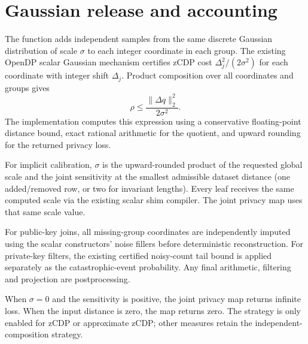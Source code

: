 \documentclass{article}
\begin{document}
\section{Gaussian release and accounting}

The function adds independent samples from the same discrete Gaussian
distribution of scale \(\sigma\) to each integer coordinate in each group.
The existing OpenDP scalar Gaussian mechanism certifies zCDP cost
\(\Delta_j^2/(2\sigma^2)\) for each coordinate with integer shift
\(\Delta_j\). Product composition over all coordinates and groups gives
\[
  \rho \le \frac{\|\Delta q\|_2^2}{2\sigma^2}.
\]
The implementation computes this expression using a conservative
floating-point distance bound, exact rational arithmetic for the quotient,
and upward rounding for the returned privacy loss.

For implicit calibration, \(\sigma\) is the upward-rounded product of the
requested global scale and the joint sensitivity at the smallest admissible
dataset distance (one added/removed row, or two for invariant lengths).
Every leaf receives the same computed scale via the existing scalar shim
compiler. The joint privacy map uses that same scale value.

For public-key joins, all missing-group coordinates are independently
imputed using the scalar constructors' noise fillers before deterministic
reconstruction. For private-key filters, the existing certified noisy-count
tail bound is applied separately as the catastrophic-event probability.
Any final arithmetic, filtering and projection are postprocessing.

When \(\sigma=0\) and the sensitivity is positive, the joint privacy map
returns infinite loss. When the input distance is zero, the map returns zero.
The strategy is only enabled for zCDP or approximate zCDP; other measures
retain the independent-composition strategy.
\end{document}
